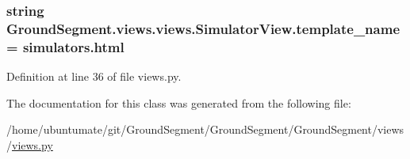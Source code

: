 \subsubsection[{template\+\_\+name}]{\setlength{\rightskip}{0pt plus 5cm}string Ground\+Segment.\+views.\+views.\+Simulator\+View.\+template\+\_\+name = \textquotesingle{}simulators.\+html\textquotesingle{}\hspace{0.3cm}{\ttfamily [static]}}\label{class_ground_segment_1_1views_1_1views_1_1_simulator_view_a6cd2a147c5f5f4a4eb74395fb56c7742}


Definition at line 36 of file views.\+py.



The documentation for this class was generated from the following file\+:\begin{DoxyCompactItemize}
\item 
/home/ubuntumate/git/\+Ground\+Segment/\+Ground\+Segment/\+Ground\+Segment/views/\hyperlink{views_8py}{views.\+py}\end{DoxyCompactItemize}

